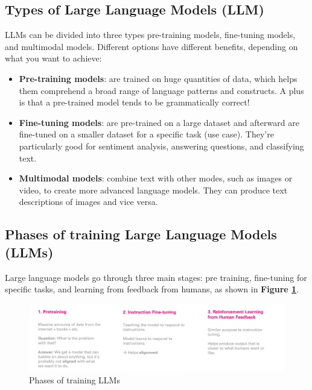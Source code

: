 \subsection{Types of Large Language Models (LLM)}
LLMs can be divided into three types pre-training models, fine-tuning models, and multimodal models. Different options have different benefits, depending on what you want to achieve:
\vskip 0.5cm
\begin{itemize}
    \item \textbf{Pre-training models}: are trained on huge quantities of data, which helps them comprehend a broad range of language patterns and constructs. A plus is that a pre-trained model tends to be grammatically correct!
    \item \textbf{Fine-tuning models}: are pre-trained on a large dataset and afterward are fine-tuned on a smaller dataset for a specific task (use case). They’re particularly good for sentiment analysis, answering questions, and classifying text.
    \item \textbf{Multimodal models}: combine text with other modes, such as images or video, to create more advanced language models. They can produce text descriptions of images and vice versa.
\end{itemize}

\subsection{Phases of training Large Language Models (LLMs)}
Large language models go through three main stages: pre training, fine-tuning for specific tasks, and learning from feedback from humans, as shown in \textbf{Figure \ref{fig:phases-llm}}\cite{w11}.
\begin{figure}[H]
    \label{fig:phases-llm}
    \centering
    \includegraphics[width=0.9 \linewidth]{assets/gpt-phases.png}
    \caption{Phases of training LLMs}
\end{figure}

